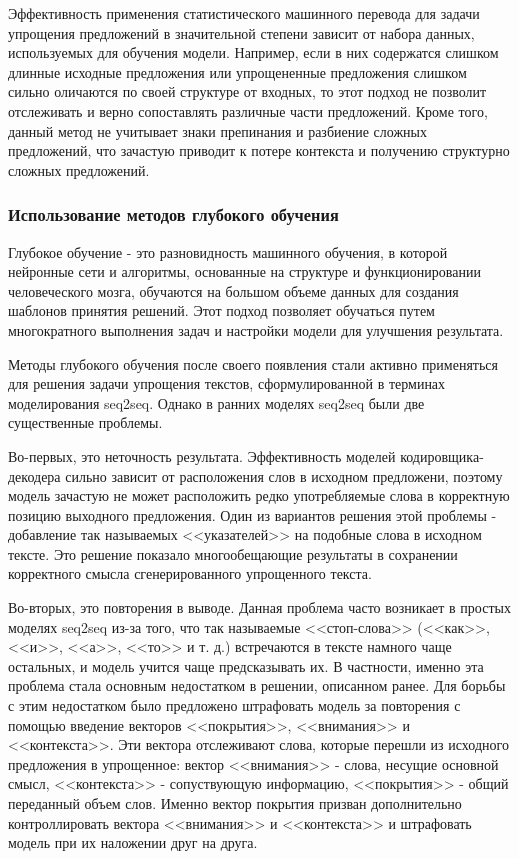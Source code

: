 Эффективность применения статистического машинного перевода для задачи упрощения предложений в значительной степени зависит от набора данных, используемых для обучения модели. Например, если в них содержатся слишком длинные исходные предложения или упрощененные предложения слишком сильно оличаются по своей структуре от входных, то этот подход не позволит отслеживать и верно сопоставлять различные части предложений. Кроме того, данный метод не учитывает знаки препинания и разбиение сложных предложений, что зачастую приводит к потере контекста и получению структурно сложных предложений.


\subsubsection{Использование методов глубокого обучения}

Глубокое обучение - это разновидность машинного обучения, в которой нейронные сети и алгоритмы, основанные на структуре и функционировании человеческого мозга, обучаются на большом объеме данных для создания шаблонов принятия решений. Этот подход позволяет обучаться путем многократного выполнения задач и настройки модели для улучшения результата\cite{deep}.

Методы глубокого обучения после своего появления стали активно применяться для решения задачи упрощения текстов, сформулированной в терминах моделирования seq2seq. Однако в ранних моделях seq2seq были две существенные проблемы.

Во-первых, это неточность результата. Эффективность моделей кодировщика-декодера сильно зависит от расположения слов в исходном предложени, поэтому модель зачастую не может расположить редко употребляемые слова в корректную позицию выходного предложения. Один из вариантов решения этой проблемы -   добавление так называемых <<указателей>> на подобные слова в исходном тексте\cite{nisioi_exploring_2017}. Это решение показало многообещающие результаты в сохранении корректного смысла сгенерированного упрощенного текста.

Во-вторых, это повторения в выводе. Данная проблема часто возникает в простых моделях seq2seq из-за того, что так называемые <<стоп-слова>> (<<как>>, <<и>>, <<а>>, <<то>> и т. д.) встречаются в тексте намного чаще остальных, и модель учится чаще предсказывать их. В частности, именно эта проблема стала основным недостатком в решении, описанном ранее\cite{nisioi_exploring_2017}. Для борьбы с этим недостатком было предложено штрафовать модель за повторения с помощью введение векторов <<покрытия>>, <<внимания>> и <<контекста>>. Эти вектора отслеживают слова, которые перешли из исходного предложения в упрощенное: вектор <<внимания>> - слова, несущие основной смысл, <<контекста>> - сопуствующую информацию, <<покрытия>> - общий переданный объем слов. Именно вектор покрытия призван дополнительно контроллировать вектора  <<внимания>> и <<контекста>> и штрафовать модель при их наложении друг на друга\cite{see_get_2017}.

